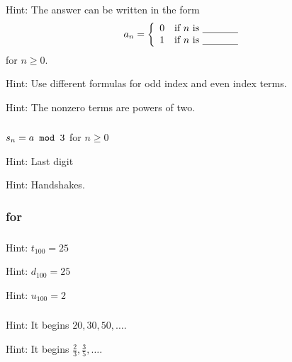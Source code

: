 \subsubsection*{ \answers}
\begin{apart}
    \item Hint: The answer can be written in the form $$a_n= \left\{ \begin{array} {cl} 
    0 & \text{if } n \text{ is \underline{\hspace{.5in}}} \\
    1 & \text{if } n \text{ is \underline{\hspace{.5in}}} \end{array} \right.$$ for $n \ge 0$.
    \item Hint: Use different formulas for odd index and even index terms.
    \item Hint: The nonzero terms are powers of two.
\end{apart}

\subsubsection*{ \answers}
\begin{apart}
    \item $s_n=a \texttt{ mod } 3$ for $n \ge 0$
    \item Hint: Last digit
    \item Hint: Handshakes.
\end{apart}

\subsubsection{\answers for  \subseqprimes}

\subsubsection*{ \answers}
\begin{apart}
    \item Hint: $t_{100}=25$
    \item Hint: $d_{100}=25$
    \item Hint: $u_{100}=2$
\end{apart}

\subsubsection*{ \answers}
\begin{apart}
    \item Hint: It begins $20, 30, 50, \ldots$.
    \item Hint: It begins $\frac{2}{3}, \frac{3}{5}, \ldots$.
\end{apart}

